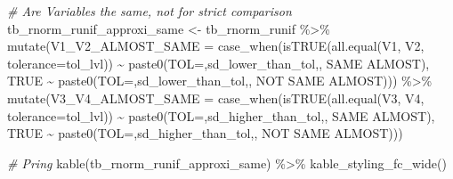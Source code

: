 \documentclass[
]{book}
\newenvironment{Shaded}{\begin{snugshade}}{\end{snugshade}}
\newcommand{\AttributeTok}[1]{\textcolor[rgb]{0.77,0.63,0.00}{#1}}
\newcommand{\CommentTok}[1]{\textcolor[rgb]{0.56,0.35,0.01}{\textit{#1}}}
\newcommand{\ConstantTok}[1]{\textcolor[rgb]{0.00,0.00,0.00}{#1}}
\newcommand{\FunctionTok}[1]{\textcolor[rgb]{0.00,0.00,0.00}{#1}}
\newcommand{\NormalTok}[1]{#1}
\newcommand{\OtherTok}[1]{\textcolor[rgb]{0.56,0.35,0.01}{#1}}
\newcommand{\SpecialCharTok}[1]{\textcolor[rgb]{0.00,0.00,0.00}{#1}}
\newcommand{\StringTok}[1]{\textcolor[rgb]{0.31,0.60,0.02}{#1}}
\begin{document}
\begin{Shaded}
\begin{Highlighting}[]
\CommentTok{\# Are Variables the same, not for strict comparison}
\NormalTok{tb\_rnorm\_runif\_approxi\_same }\OtherTok{\textless{}{-}}\NormalTok{ tb\_rnorm\_runif }\SpecialCharTok{\%\textgreater{}\%}
  \FunctionTok{mutate}\NormalTok{(}\AttributeTok{V1\_V2\_ALMOST\_SAME =} 
           \FunctionTok{case\_when}\NormalTok{(}\FunctionTok{isTRUE}\NormalTok{(}\FunctionTok{all.equal}\NormalTok{(V1, V2, }\AttributeTok{tolerance=}\NormalTok{tol\_lvl)) }\SpecialCharTok{\textasciitilde{}} 
                       \FunctionTok{paste0}\NormalTok{(}\StringTok{\textquotesingle{}TOL=\textquotesingle{}}\NormalTok{,sd\_lower\_than\_tol,}\StringTok{\textquotesingle{}, SAME ALMOST\textquotesingle{}}\NormalTok{),}
                     \ConstantTok{TRUE} \SpecialCharTok{\textasciitilde{}} 
                       \FunctionTok{paste0}\NormalTok{(}\StringTok{\textquotesingle{}TOL=\textquotesingle{}}\NormalTok{,sd\_lower\_than\_tol,}\StringTok{\textquotesingle{}, NOT SAME ALMOST\textquotesingle{}}\NormalTok{))) }\SpecialCharTok{\%\textgreater{}\%}
  \FunctionTok{mutate}\NormalTok{(}\AttributeTok{V3\_V4\_ALMOST\_SAME =}
           \FunctionTok{case\_when}\NormalTok{(}\FunctionTok{isTRUE}\NormalTok{(}\FunctionTok{all.equal}\NormalTok{(V3, V4, }\AttributeTok{tolerance=}\NormalTok{tol\_lvl)) }\SpecialCharTok{\textasciitilde{}} 
                       \FunctionTok{paste0}\NormalTok{(}\StringTok{\textquotesingle{}TOL=\textquotesingle{}}\NormalTok{,sd\_higher\_than\_tol,}\StringTok{\textquotesingle{}, SAME ALMOST\textquotesingle{}}\NormalTok{),}
                     \ConstantTok{TRUE} \SpecialCharTok{\textasciitilde{}} 
                       \FunctionTok{paste0}\NormalTok{(}\StringTok{\textquotesingle{}TOL=\textquotesingle{}}\NormalTok{,sd\_higher\_than\_tol,}\StringTok{\textquotesingle{}, NOT SAME ALMOST\textquotesingle{}}\NormalTok{)))}

\CommentTok{\# Pring}
\FunctionTok{kable}\NormalTok{(tb\_rnorm\_runif\_approxi\_same) }\SpecialCharTok{\%\textgreater{}\%} \FunctionTok{kable\_styling\_fc\_wide}\NormalTok{()}
\end{Highlighting}
\end{Shaded}
\end{document}
